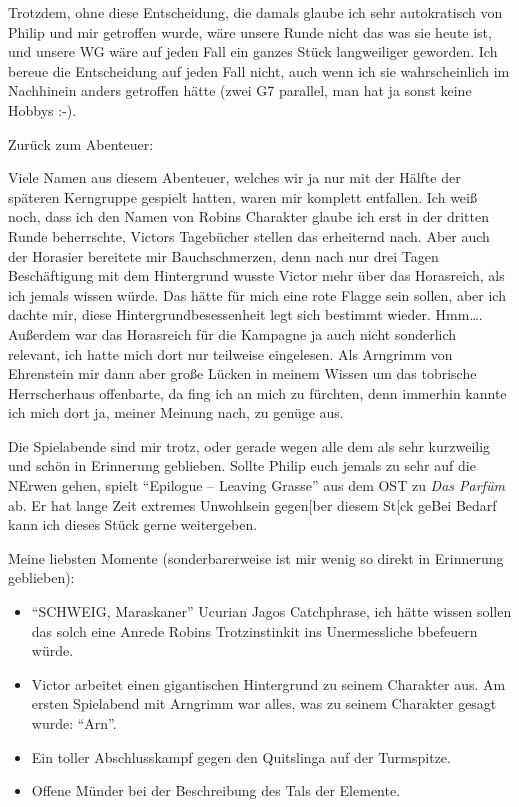 Trotzdem, ohne diese Entscheidung, die damals glaube ich sehr autokratisch von Philip und mir getroffen wurde, wäre unsere Runde nicht das was sie heute ist, und unsere WG wäre auf jeden Fall ein ganzes Stück langweiliger geworden. Ich bereue die Entscheidung auf jeden Fall nicht, auch wenn ich sie wahrscheinlich im Nachhinein anders getroffen hätte (zwei G7 parallel, man hat ja sonst keine Hobbys :-).

Zurück zum Abenteuer: 

Viele Namen aus diesem Abenteuer, welches wir ja nur mit der Hälfte der späteren Kerngruppe gespielt hatten, waren mir komplett entfallen. Ich weiß noch, dass ich den Namen von Robins Charakter glaube ich erst in der dritten Runde beherrschte, Victors Tagebücher stellen das erheiternd nach. Aber auch der Horasier bereitete mir Bauchschmerzen, denn nach nur drei Tagen Beschäftigung mit dem Hintergrund wusste Victor mehr über das Horasreich, als ich jemals wissen würde. Das hätte für mich eine rote Flagge sein sollen, aber ich dachte mir, diese Hintergrundbesessenheit legt sich bestimmt wieder. Hmm\dots. Außerdem war das Horasreich für die Kampagne ja auch nicht sonderlich relevant, ich hatte mich dort nur teilweise eingelesen. Als Arngrimm von Ehrenstein mir dann aber große Lücken in meinem Wissen um das tobrische Herrscherhaus offenbarte, da fing ich an mich zu fürchten, denn immerhin kannte ich mich dort ja, meiner Meinung nach, zu genüge aus.

Die Spielabende sind mir trotz, oder gerade wegen alle dem als sehr kurzweilig und schön in Erinnerung geblieben. Sollte Philip euch jemals zu sehr auf die NErwen gehen, spielt ``Epilogue -- Leaving Grasse'' aus dem OST zu \emph{Das Parfüm} ab. Er hat lange Zeit extremes Unwohlsein gegen[ber diesem St[ck geBei Bedarf kann ich dieses Stück gerne weitergeben.


Meine liebsten Momente (sonderbarerweise ist mir wenig so direkt in Erinnerung geblieben):


\begin{itemize}
\item ``SCHWEIG, Maraskaner'' Ucurian Jagos Catchphrase, ich hätte wissen sollen das solch eine Anrede Robins Trotzinstinkit ins Unermessliche bbefeuern würde.
\item Victor arbeitet einen gigantischen Hintergrund zu seinem Charakter aus. Am ersten Spielabend mit Arngrimm war alles, was zu seinem Charakter  gesagt wurde: ``Arn''.
\item Ein toller Abschlusskampf gegen den Quitslinga auf der Turmspitze.
\item Offene Münder bei der Beschreibung des Tals der Elemente.
\end{itemize}

